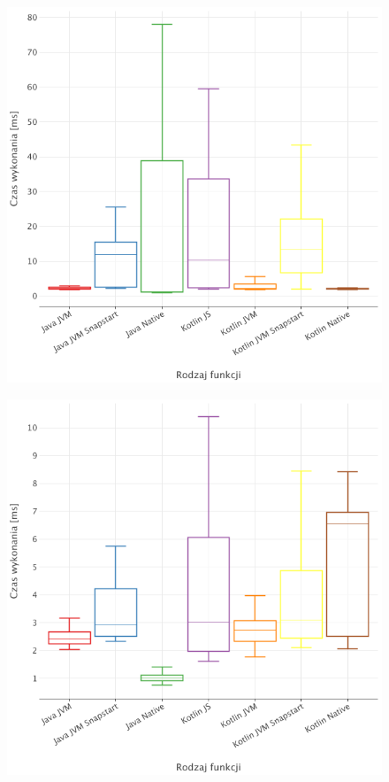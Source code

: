 \begin{figure}[htbp]
    \centering %
    \begin{minipage}[t]{0.48\textwidth} %
        \centering %
        \includegraphics[width=\linewidth]{charts/results/warm-start-boxplot-256.png}
        \label{fig:warm_start_128} %
    \end{minipage}%
    \hfill %
    \begin{minipage}[t]{0.48\textwidth}
        \centering
        \includegraphics[width=\linewidth]{charts/results/warm-start-boxplot-1024.png}

\end{minipage}
\end{figure}

